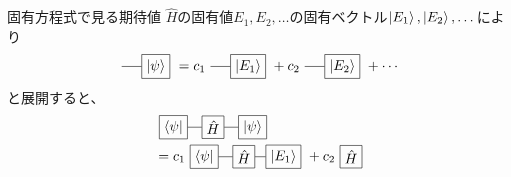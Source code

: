 \documentclass[dvipdfm]{beamer}
\begin{document}
\begin{frame}{固有方程式で見る期待値}
    $\hat{H}$の固有値$E_1,E_2,\dots$の固有ベクトル$\ket{E_1},\ket{E_2},\dots$により
    \begin{equation*}
        \vcenter{\hbox{
            \begin{tikzpicture}
                \node at(1.5,0)[draw, rectangle](ket){$\ket{\psi}$};
                \draw(ket.west)--++(-.5,0);
            \end{tikzpicture}
        }}
        =
        c_1
        \vcenter{\hbox{
            \begin{tikzpicture}
                \node at(1.5,0)[draw, rectangle](ket){$\ket{E_1}$};
                \draw(ket.west)--++(-.5,0);
            \end{tikzpicture}
        }}
        +
        c_2
        \vcenter{\hbox{
            \begin{tikzpicture}
                \node at(1.5,0)[draw, rectangle](ket){$\ket{E_2}$};
                \draw(ket.west)--++(-.5,0);
            \end{tikzpicture}
        }}
        +
        \cdots
    \end{equation*}
    と展開すると、
    \begin{equation*}
        \begin{split}
            &
            \vcenter{\hbox{
                \begin{tikzpicture}
                    \node at(0,0)[draw, rectangle](H){$\hat{H}$};
                    \node at(1.,0)[draw, rectangle](ket){$\ket{\psi}$};
                    \node at(-1.,0)[draw, rectangle](bra){$\bra{\psi}$};
                    \draw(H.west)--(bra.east);
                    \draw(H.east)--(ket.west);
                \end{tikzpicture}
            }}
            \\
            &=
            c_1
            \vcenter{\hbox{
                \begin{tikzpicture}
                    \node at(0,0)[draw, rectangle](H){$\hat{H}$};
                    \node at(1.,0)[draw, rectangle](ket){$\ket{E_1}$};
                    \node at(-1.,0)[draw, rectangle](bra){$\bra{\psi}$};
                    \draw(H.west)--(bra.east);
                    \draw(H.east)--(ket.west);
                \end{tikzpicture}
            }}
            +
            c_2
            \vcenter{\hbox{
                \begin{tikzpicture}
                    \node at(0,0)[draw, rectangle](H){$\hat{H}$};

\end{tikzpicture}}}
\end{split}
\end{equation*}
\end{frame}
\end{document}

